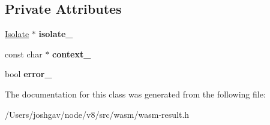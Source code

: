 \subsection*{Private Attributes}
\begin{DoxyCompactItemize}
\item 
\hyperlink{classv8_1_1internal_1_1_isolate}{Isolate} $\ast$ {\bfseries isolate\+\_\+}\hypertarget{classv8_1_1internal_1_1wasm_1_1_error_thrower_ade55f33b7ab79bad9f675c4a85d3b6d5}{}\label{classv8_1_1internal_1_1wasm_1_1_error_thrower_ade55f33b7ab79bad9f675c4a85d3b6d5}

\item 
const char $\ast$ {\bfseries context\+\_\+}\hypertarget{classv8_1_1internal_1_1wasm_1_1_error_thrower_a52fe82068cab896481c9b6d2c99c9565}{}\label{classv8_1_1internal_1_1wasm_1_1_error_thrower_a52fe82068cab896481c9b6d2c99c9565}

\item 
bool {\bfseries error\+\_\+}\hypertarget{classv8_1_1internal_1_1wasm_1_1_error_thrower_a12ab1e7de6fa46fd3735fca9455ea623}{}\label{classv8_1_1internal_1_1wasm_1_1_error_thrower_a12ab1e7de6fa46fd3735fca9455ea623}

\end{DoxyCompactItemize}


The documentation for this class was generated from the following file\+:\begin{DoxyCompactItemize}
\item 
/\+Users/joshgav/node/v8/src/wasm/wasm-\/result.\+h\end{DoxyCompactItemize}

